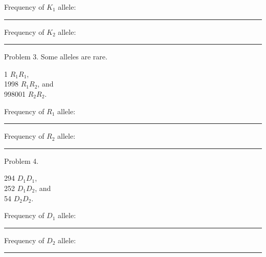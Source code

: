 \documentclass[letterpaper]{tufte-handout}
\begin{document}
\vspace{\baselineskip}

Frequency of $K_1$ allele: \rule{1in}{0.4pt} 

\vspace{\baselineskip}

Frequency of $K_2$ allele: \rule{1in}{0.4pt} 

\vspace{\baselineskip}

\noindent Problem 3. Some alleles are rare.\vspace{\baselineskip}

1 $R_1R_1$, \\
1998 $R_1R_2$, and \\
998001 $R_2R_2$.

\vspace{\baselineskip}

Frequency of $R_1$ allele: \rule{1in}{0.4pt} 

\vspace{\baselineskip}

Frequency of $R_2$ allele: \rule{1in}{0.4pt} 

\vspace{\baselineskip}

\noindent Problem 4.\vspace{\baselineskip}

294 $D_1D_1$, \\
252 $D_1D_2$, and \\
54 $D_2D_2$.

\vspace{\baselineskip}

Frequency of $D_1$ allele: \rule{1in}{0.4pt} 

\vspace{\baselineskip}

Frequency of $D_2$ allele: \rule{1in}{0.4pt} 
\end{document}

